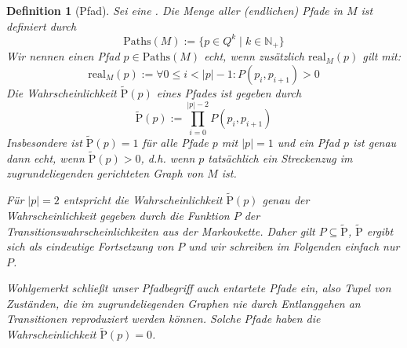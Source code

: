 \documentclass[a4paper]{article}
\newtheorem{definition}[satz]{Definition} %
\theoremstyle{nonumberplain}
\begin{document}
\newcommand{\gpath}{Pfad}
\begin{definition}[\gpath]\label{def-path}
	Sei \mcex{} eine \mc{}. Die Menge aller (endlichen) \gpath e in $M$ ist definiert durch
	\begin{equation}
		\mathrm{Paths}(M) := \{p \in Q^{k} \mid k \in \mathbb{N}_{+}\}
	\end{equation}
	Wir nennen einen \gpath{} $p \in \mathrm{Paths}(M)$ echt, wenn zusätzlich $\mathrm{real}_{M}(p)$ gilt mit:
	\begin{equation}
		\mathrm{real}_{M}(p) := \forall 0 \leq i < |p| - 1 : P(p_i,p_{i+1}) > 0
	\end{equation}
	Die Wahrscheinlichkeit $\mathrm{\tilde{P}}(p)$ eines Pfades ist gegeben durch
	\begin{equation}
		\mathrm{\tilde{P}}(p) := \prod_{i = 0}^{|p| - 2}{P(p_i,p_{i+1})}
	\end{equation}
	Insbesondere ist $\mathrm{\tilde{P}}(p) = 1$ für alle Pfade $p$ mit $|p| = 1$ und ein Pfad $p$ ist genau dann echt, wenn $\mathrm{\tilde{P}}(p) > 0$, d.h. wenn $p$ tatsächlich ein Streckenzug im zugrundeliegenden gerichteten Graph von $M$ ist.
	
	Für $|p| = 2$ entspricht die Wahrscheinlichkeit $\mathrm{\tilde{P}}(p)$ genau der Wahrscheinlichkeit gegeben durch die Funktion $P$ der Transitionswahrscheinlichkeiten aus der Markovkette. Daher gilt $P \subseteq \mathrm{\tilde{P}}$, $\mathrm{\tilde{P}}$ ergibt sich als eindeutige Fortsetzung von $P$ und wir schreiben im Folgenden einfach nur $P$.
	
	Wohlgemerkt schließt unser Pfadbegriff auch entartete Pfade ein, also Tupel von Zuständen, die im zugrundeliegenden Graphen nie durch Entlanggehen an Transitionen reproduziert werden können. Solche Pfade haben die Wahrscheinlichkeit $\mathrm{\tilde{P}}(p) = 0$.
\end{definition}
\end{document}
